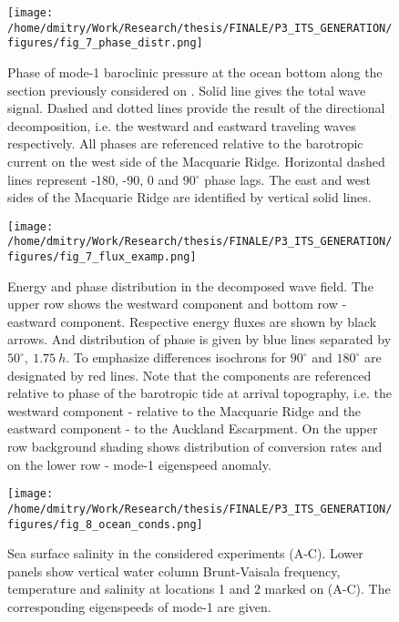 \documentclass[12pt]{article}
\newcommand{\SCALEO}{2}
\begin{document}
\begin{figure}
	\centering
	\texttt{[image: /home/dmitry/Work/Research/thesis/FINALE/P3\_ITS\_GENERATION/figures/fig\_7\_phase\_distr.png]}
	\caption{Phase of mode-1 baroclinic pressure at the ocean bottom along the section previously 
	considered on . Solid line gives the total wave signal. Dashed and dotted 
	lines provide the result of the directional decomposition, i.e. the westward and eastward 
	traveling waves	respectively. All phases are referenced relative to the barotropic current on 
	the west side of the Macquarie Ridge. Horizontal dashed lines represent -180, -90, 0 and 
	90$^\circ$ phase lags. The east and west sides of the Macquarie Ridge are identified by 
	vertical solid lines.}
\label{C3.fig:2d_phase}
\end{figure}

\begin{figure}
	\centering
	\texttt{[image: /home/dmitry/Work/Research/thesis/FINALE/P3\_ITS\_GENERATION/figures/fig\_7\_flux\_examp.png]}
	\caption{Energy and phase distribution in the decomposed wave field. The upper row shows the 
	westward component and bottom row - eastward component. Respective energy fluxes are shown by 
	black arrows. And distribution of phase is given by blue lines separated by 
	$50^{\circ},~1.75~h$. To emphasize differences isochrons for $90^{\circ}$ and $180^{\circ}$ are 
	designated by red lines. Note that the components are referenced relative to phase of the 
	barotropic tide at arrival topography, i.e. the westward component  - relative to the 
	Macquarie Ridge and the eastward component - to the Auckland Escarpment. On the upper row 
	background shading shows distribution of conversion rates and on the lower row - mode-1 
	eigenspeed anomaly.}
	\label{C3.fig:wv_fld_dist}
\end{figure}

\begin{figure}
	\centering
	\texttt{[image: /home/dmitry/Work/Research/thesis/FINALE/P3\_ITS\_GENERATION/figures/fig\_8\_ocean\_conds.png]}
	\caption{Sea surface salinity in the considered experiments (A-C). Lower panels show 
	vertical water column Brunt-Vaisala frequency, temperature and salinity at locations 1 and 2 
	marked on (A-C). The corresponding eigenspeeds of mode-1 are given.}
	\label{C3.fig:ocean_cond}
\end{figure}
\end{document}
